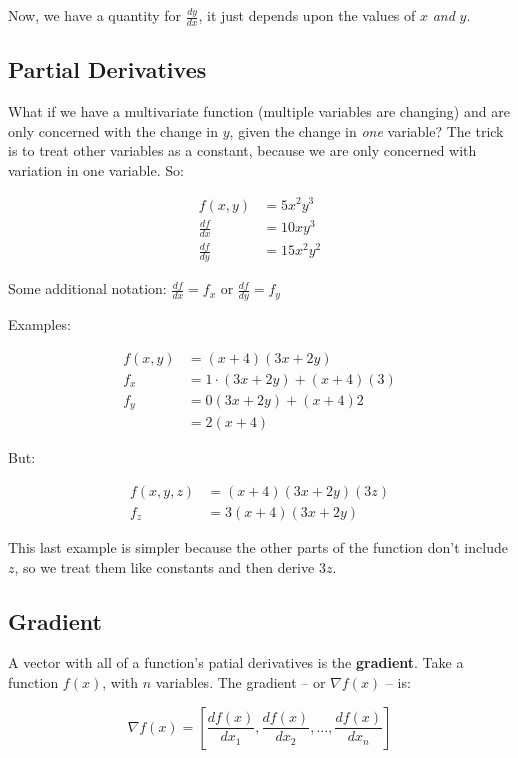 Now, we have a quantity for $\frac{dy}{dx}$, it just depends upon the values of $x$ \emph{and} $y$.

\subsection{Partial Derivatives}

What if we have a multivariate function (multiple variables are changing) and are only concerned with the change in $y$, given the change in \emph{one} variable? The trick is to treat other variables as a constant, because we are only concerned with variation in one variable. So:

\begin{align*}
    f(x,y) & = 5x^2y^3 \\
    \frac{df}{dx} & = 10xy^3 \\
    \frac{df}{dy} & = 15x^2y^2
\end{align*}

\noindent Some additional notation: $\frac{df}{dx} = f_x$ or 
$\frac{df}{dy} = f_y$

\noindent Examples:

\begin{align*}
    f(x,y) & = (x + 4)(3x + 2y) \\
    f_x & = 1 \cdot (3x + 2y) + (x + 4)(3) \\
    f_y & = 0(3x + 2y) + (x + 4)2 \\
        & = 2(x + 4)
\end{align*}

\noindent But:

\begin{align*}
    f(x, y, z) & = (x + 4)(3x + 2y)(3z) \\
    f_z & = 3(x + 4)(3x + 2y)
\end{align*}

\noindent This last example is simpler because the other parts of the function don't include $z$, so we treat them like constants and then derive $3z$.

\subsection{Gradient}

A vector with all of a function's patial derivatives is the \textbf{gradient}. Take a function $f(x)$, with $n$ variables. The gradient -- or $\nabla f(x)$ -- is: 

\begin{equation*}
    \nabla f(x) = \left[\frac{d f(x)}{dx_1}, \frac{d f(x)}{dx_2}, 
    ..., \frac{d f(x)}{dx_n}\right]
\end{equation*}

